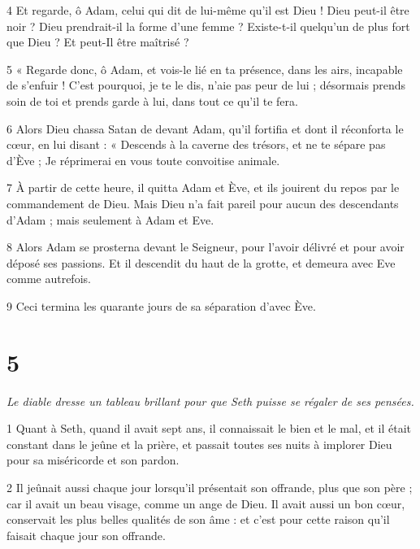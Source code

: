 \par 4 Et regarde, ô Adam, celui qui dit de lui-même qu'il est Dieu ! Dieu peut-il être noir ? Dieu prendrait-il la forme d'une femme ? Existe-t-il quelqu'un de plus fort que Dieu ? Et peut-Il être maîtrisé ?

\par 5 « Regarde donc, ô Adam, et vois-le lié en ta présence, dans les airs, incapable de s'enfuir ! C'est pourquoi, je te le dis, n'aie pas peur de lui ; désormais prends soin de toi et prends garde à lui, dans tout ce qu'il te fera.

\par 6 Alors Dieu chassa Satan de devant Adam, qu'il fortifia et dont il réconforta le cœur, en lui disant : « Descends à la caverne des trésors, et ne te sépare pas d'Ève ; Je réprimerai en vous toute convoitise animale.

\par 7 À partir de cette heure, il quitta Adam et Ève, et ils jouirent du repos par le commandement de Dieu. Mais Dieu n’a fait pareil pour aucun des descendants d’Adam ; mais seulement à Adam et Eve.

\par 8 Alors Adam se prosterna devant le Seigneur, pour l'avoir délivré et pour avoir déposé ses passions. Et il descendit du haut de la grotte, et demeura avec Eve comme autrefois.

\par 9 Ceci termina les quarante jours de sa séparation d'avec Ève.

\chapter{5}

\par \textit{Le diable dresse un tableau brillant pour que Seth puisse se régaler de ses pensées.}

\par 1 Quant à Seth, quand il avait sept ans, il connaissait le bien et le mal, et il était constant dans le jeûne et la prière, et passait toutes ses nuits à implorer Dieu pour sa miséricorde et son pardon.

\par 2 Il jeûnait aussi chaque jour lorsqu'il présentait son offrande, plus que son père ; car il avait un beau visage, comme un ange de Dieu. Il avait aussi un bon cœur, conservait les plus belles qualités de son âme : et c'est pour cette raison qu'il faisait chaque jour son offrande.

